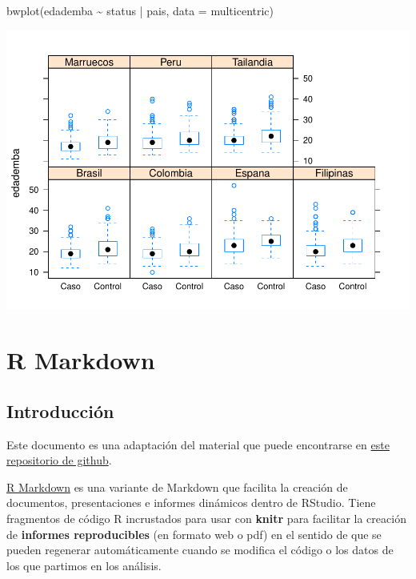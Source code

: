 \documentclass[
]{book}
\newenvironment{Shaded}{\begin{snugshade}}{\end{snugshade}}
\newcommand{\AttributeTok}[1]{\textcolor[rgb]{0.77,0.63,0.00}{#1}}
\newcommand{\FunctionTok}[1]{\textcolor[rgb]{0.00,0.00,0.00}{#1}}
\newcommand{\NormalTok}[1]{#1}
\newcommand{\SpecialCharTok}[1]{\textcolor[rgb]{0.00,0.00,0.00}{#1}}
\begin{document}
\begin{Shaded}
\begin{Highlighting}[]
\FunctionTok{bwplot}\NormalTok{(edademba }\SpecialCharTok{\textasciitilde{}}\NormalTok{ status }\SpecialCharTok{|}\NormalTok{ pais,}
        \AttributeTok{data =}\NormalTok{ multicentric)}
\end{Highlighting}
\end{Shaded}

\includegraphics{fig/unnamed-chunk-115-1.pdf}

\hypertarget{r-markdown}{%
\chapter{R Markdown}\label{r-markdown}}

\hypertarget{introducciuxf3n-1}{%
\section{Introducción}\label{introducciuxf3n-1}}

Este documento es una adaptación del material que puede encontrarse en \href{https://github.com/marschmi/rmarkdown_May11_2016}{este repositorio de github}.

\href{https://rmarkdown.rstudio.com/}{R Markdown} es una variante de Markdown que facilita la creación de documentos, presentaciones e informes dinámicos dentro de RStudio. Tiene fragmentos de código R incrustados para usar con \textbf{knitr} para facilitar la creación de \textbf{informes reproducibles} (en formato web o pdf) en el sentido de que se pueden regenerar automáticamente cuando se modifica el código o los datos de los que partimos en los análisis.
\end{document}
